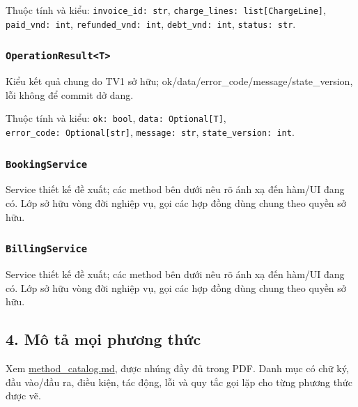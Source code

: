\documentclass[11pt,a4paper]{article}
\begin{document}
Thuộc tính và kiểu: \texttt{invoice\_id:\ str},
\texttt{charge\_lines:\ list{[}ChargeLine{]}}, \texttt{paid\_vnd:\ int},
\texttt{refunded\_vnd:\ int}, \texttt{debt\_vnd:\ int},
\texttt{status:\ str}.

\hypertarget{operationresultt}{%
\subsubsection{\texorpdfstring{\texttt{OperationResult\textless{}T\textgreater{}}}{OperationResult\textless T\textgreater{}}}\label{operationresultt}}

Kiểu kết quả chung do TV1 sở hữu;
ok/data/error\_code/message/state\_version, lỗi không để commit dở dang.

Thuộc tính và kiểu: \texttt{ok:\ bool}, \texttt{data:\ Optional{[}T{]}},
\texttt{error\_code:\ Optional{[}str{]}}, \texttt{message:\ str},
\texttt{state\_version:\ int}.

\hypertarget{bookingservice}{%
\subsubsection{\texorpdfstring{\texttt{BookingService}}{BookingService}}\label{bookingservice}}

Service thiết kế đề xuất; các method bên dưới nêu rõ ánh xạ đến hàm/UI
đang có. Lớp sở hữu vòng đời nghiệp vụ, gọi các hợp đồng dùng chung theo
quyền sở hữu.

\hypertarget{billingservice}{%
\subsubsection{\texorpdfstring{\texttt{BillingService}}{BillingService}}\label{billingservice}}

Service thiết kế đề xuất; các method bên dưới nêu rõ ánh xạ đến hàm/UI
đang có. Lớp sở hữu vòng đời nghiệp vụ, gọi các hợp đồng dùng chung theo
quyền sở hữu.

\hypertarget{muxf4-tux1ea3-mux1ecdi-phux1b0ux1a1ng-thux1ee9c}{%
\subsection{4. Mô tả mọi phương
thức}\label{muxf4-tux1ea3-mux1ecdi-phux1b0ux1a1ng-thux1ee9c}}

Xem \url{method_catalog.md}, được nhúng đầy đủ trong PDF. Danh mục có
chữ ký, đầu vào/đầu ra, điều kiện, tác động, lỗi và quy tắc gọi lặp cho
từng phương thức được vẽ.
\end{document}
